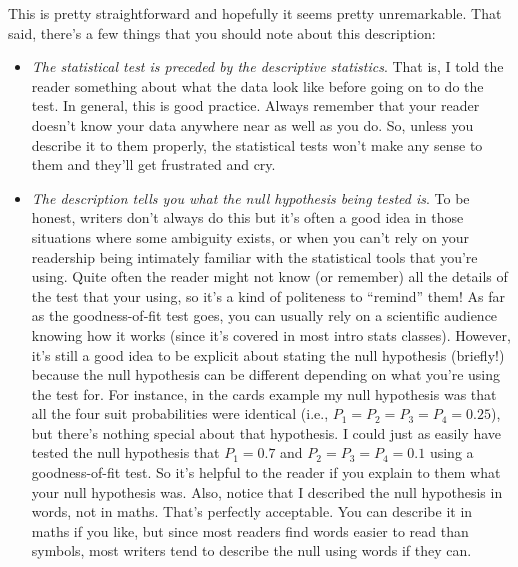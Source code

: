 \noindent
This is pretty straightforward and hopefully it seems pretty unremarkable. That said, there's a few things that you should note about this description:
\begin{itemize}
\item {\it The statistical test is preceded by the descriptive statistics}. That is, I told the reader something about what the data look like before going on to do the test. In general, this is good practice. Always remember that your reader doesn't know your data anywhere near as well as you do. So, unless you describe it to them properly, the statistical tests won't make any sense to them and they'll get frustrated and cry.
\item {\it The description tells you what the null hypothesis being tested is}. To be honest, writers don't always do this but it's often a good idea in those situations where some ambiguity exists, or when you can't rely on your readership being intimately familiar with the statistical tools that you're using. Quite often the reader might not know (or remember) all the details of the test that your using, so it's a kind of politeness to ``remind'' them! As far as the goodness-of-fit test goes, you can usually rely on a scientific audience knowing how it works (since it's covered in most intro stats classes). However, it's still a good idea to be explicit about stating the null hypothesis (briefly!) because the null hypothesis can be different depending on what you're using the test for. For instance, in the cards example my null hypothesis was that all the four suit probabilities were identical (i.e., $P_1 = P_2 = P_3 = P_4 = 0.25$), but there's nothing special about that hypothesis. I could just as easily have tested the null hypothesis that $P_1 = 0.7$ and $P_2 = P_3 = P_4 = 0.1$ using a goodness-of-fit test. So it's helpful to the reader if you explain to them what your null hypothesis was. Also, notice that I described the null hypothesis in words, not in maths. That's perfectly acceptable. You can describe it in maths if you like, but since most readers find words easier to read than symbols, most writers tend to describe the null using words if they can.

\end{itemize}
